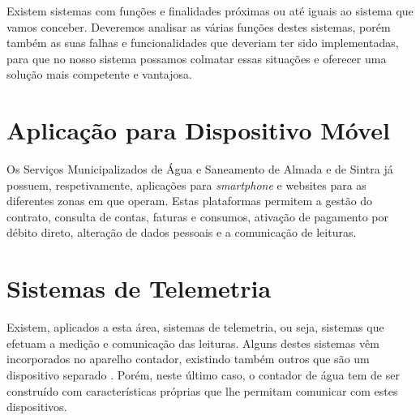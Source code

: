 Existem sistemas com funções e finalidades próximas ou até iguais ao sistema que vamos conceber. Deveremos analisar as várias funções destes sistemas, porém também as suas falhas e funcionalidades que deveriam ter sido implementadas, para que no nosso sistema possamos colmatar essas situações e oferecer uma solução mais competente e vantajosa.

\section{Aplicação para Dispositivo Móvel} \label{sec:appsmas}
Os Serviços Municipalizados de Água e Saneamento de Almada e de Sintra já possuem, respetivamente, aplicações para \textit{smartphone} \cite{smas:almada} e websites \cite{smas:sintra} para as diferentes zonas em que operam. Estas plataformas permitem a gestão do contrato, consulta de contas, faturas e consumos, ativação de pagamento por débito direto, alteração de dados pessoais e a comunicação de leituras.

\section{Sistemas de Telemetria} \label{sec:telemetria}
Existem, aplicados a esta área, sistemas de telemetria, ou seja, sistemas que efetuam a medição e comunicação das leituras. Alguns destes sistemas vêm incorporados no aparelho contador, existindo também outros que são um dispositivo separado \cite{janz:impji}. Porém, neste último caso, o contador de água tem de ser construído com características próprias que lhe permitam comunicar com estes dispositivos.
